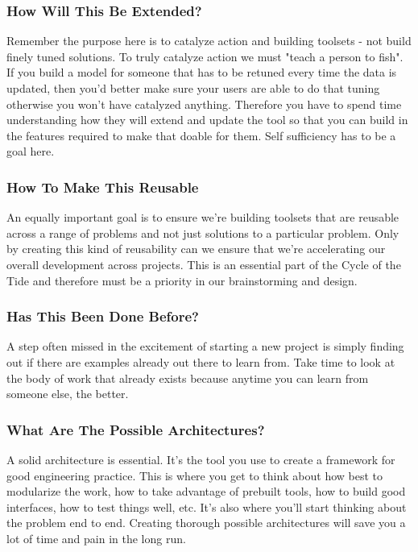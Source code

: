 \documentclass[10pt,a5paper]{book}
\begin{document}
\subsubsection{How Will This Be Extended?}
Remember the purpose here is to catalyze action and building toolsets - not build finely tuned solutions. To truly catalyze action we must "teach a person to fish". If you build a model for someone that has to be retuned every time the data is updated, then you'd better make sure your users are able to do that tuning otherwise you won't have catalyzed anything. Therefore you have to spend time understanding how they will extend and update the tool so that you can build in the features required to make that doable for them. Self sufficiency has to be a goal here. 

\subsubsection{How To Make This Reusable}
An equally important goal is to ensure we're building toolsets that are reusable across a range of problems and not just solutions to a particular problem. Only by creating this kind of reusability can we ensure that we're accelerating our overall development across projects. This is an essential part of the Cycle of the Tide and therefore must be a priority in our brainstorming and design.

\subsubsection{Has This Been Done Before?}
A step often missed in the excitement of starting a new project is simply finding out if there are examples already out there to learn from. Take time to look at the body of work that already exists because anytime you can learn from someone else, the better.

\subsubsection{What Are The Possible Architectures?}
A solid architecture is essential. It's the tool you use to create a framework for good engineering practice. This is where you get to think about how best to modularize the work, how to take advantage of prebuilt tools, how to build good interfaces, how to test things well, etc. It's also where you'll start thinking about the problem end to end. Creating thorough possible architectures will save you a lot of time and pain in the long run.
\end{document}
